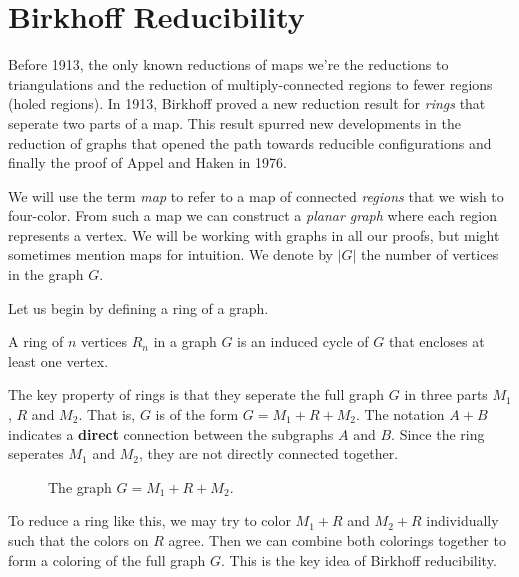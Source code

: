 \section{Birkhoff Reducibility}
\label{sec:birkhoff}

Before 1913, the only known reductions of maps we're the reductions to triangulations and the reduction of multiply-connected regions to fewer regions (holed regions). In 1913, Birkhoff \cite{birkhoff} proved a new reduction result for \textit{rings} that seperate two parts of a map. This result spurred new developments in the reduction of graphs that opened the path towards reducible configurations and finally the proof of Appel and Haken in 1976.

We will use the term \textit{map} to refer to a map of connected \textit{regions} that we wish to four-color. From such a map we can construct a \textit{planar graph} where each region represents a vertex. We will be working with graphs in all our proofs, but might sometimes mention maps for intuition. We denote by $|G|$ the number of vertices in the graph $G$.

Let us begin by defining a ring of a graph.

\begin{definition}
    A ring of $n$ vertices $R_n$ in a graph $G$ is an induced cycle of $G$ that encloses at least one vertex.
\end{definition}

The key property of rings is that they seperate the full graph $G$ in three parts $M_1$, $R$ and $M_2$. That is, $G$ is of the form $G = M_1 + R + M_2$. The notation $A + B$ indicates a \textbf{direct} connection between the subgraphs $A$ and $B$. Since the ring seperates $M_1$ and $M_2$, they are not directly connected together.

\begin{figure}[!ht]
    \centering
    \caption{The graph $G = M_1 + R + M_2$.}
\end{figure}

To reduce a ring like this, we may try to color $M_1+R$ and $M_2+R$ individually such that the colors on $R$ agree. Then we can combine both colorings together to form a coloring of the full graph $G$. This is the key idea of Birkhoff reducibility.

